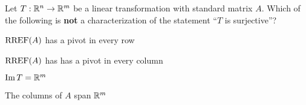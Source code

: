 \begin{readinessAssuranceTest}
\item Let $T: \mathbb{R}^n \rightarrow \mathbb{R}^m$ be a linear transformation with standard matrix $A$.  Which of the following is {\bf not} a characterization of the statement ``$T$ is surjective''?
\begin{readinessAssuranceTestChoices}
\item $\operatorname{RREF}(A)$ has a pivot in every row
\item $\operatorname{RREF}(A)$ has has a pivot in every column %
\item $\operatorname{Im} T = \mathbb{R}^m$
\item The columns of $A$ span $\mathbb{R}^m$
\end{readinessAssuranceTestChoices}


\end{readinessAssuranceTest}
